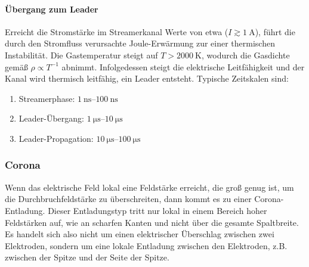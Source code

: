 \paragraph{Übergang zum Leader}
Erreicht die Stromstärke im Streamerkanal Werte von etwa ($I \gtrsim \SI{1}{\ampere}$), führt die durch den Stromfluss verursachte Joule-Erwärmung zur einer thermischen Instabilität. Die Gastemperatur steigt auf $T > \SI{2000}{\kelvin}$, wodurch die Gasdichte gemäß $\rho \propto T^{-1}$ abnimmt. Infolgedessen steigt die elektrische Leitfähigkeit und der Kanal wird thermisch leitfähig, ein Leader entsteht. 
Typische Zeitskalen sind: 
\begin{enumerate}
  \item Streamerphase: $\SIrange{1}{100}{\nano\second}$
  \item Leader-Übergang: $\SIrange{1}{10}{\micro\second}$
  \item Leader-Propagation: $\SIrange{10}{100}{\micro\second}$
 
\end{enumerate}

\subsubsection{Corona}
Wenn das elektrische Feld lokal eine Feldstärke erreicht, die groß genug ist, um die Durchbruchfeldstärke zu überschreiten, dann kommt es zu einer Corona-Entladung. Dieser Entladungstyp tritt nur lokal in einem Bereich hoher Feldstärken auf, wie an scharfen Kanten und nicht über die gesamte Spaltbreite. Es handelt sich also nicht um einen elektrischer Überschlag zwischen zwei Elektroden, sondern um eine lokale Entladung zwischen den Elektroden, z.B. zwischen der Spitze und der Seite der Spitze.
